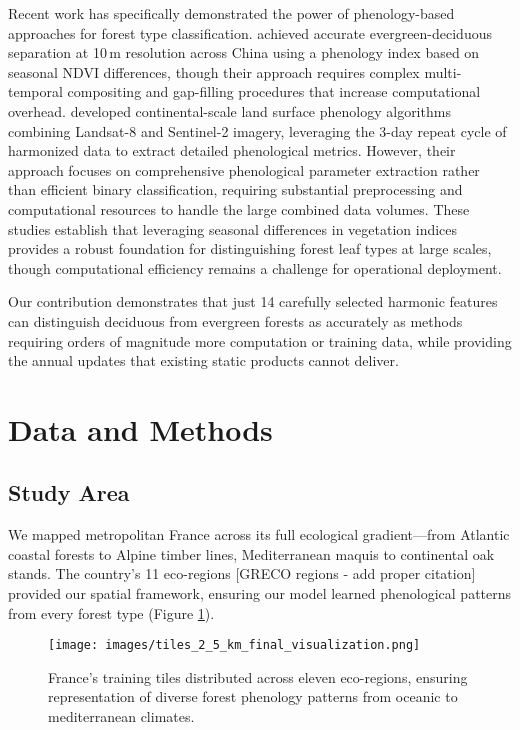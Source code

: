 \documentclass[utf8]{FrontiersinHarvard}
\begin{document}
Recent work has specifically demonstrated the power of phenology-based approaches for forest type classification. \citet{Li2023} achieved accurate evergreen-deciduous separation at 10\,m resolution across China using a phenology index based on seasonal NDVI differences, though their approach requires complex multi-temporal compositing and gap-filling procedures that increase computational overhead. \citet{Bolton2020} developed continental-scale land surface phenology algorithms combining Landsat-8 and Sentinel-2 imagery, leveraging the 3-day repeat cycle of harmonized data to extract detailed phenological metrics. However, their approach focuses on comprehensive phenological parameter extraction rather than efficient binary classification, requiring substantial preprocessing and computational resources to handle the large combined data volumes. These studies establish that leveraging seasonal differences in vegetation indices provides a robust foundation for distinguishing forest leaf types at large scales, though computational efficiency remains a challenge for operational deployment.

Our contribution demonstrates that just 14 carefully selected harmonic features can distinguish deciduous from evergreen forests as accurately as methods requiring orders of magnitude more computation or training data, while providing the annual updates that existing static products cannot deliver.

\section{Data and Methods}

\subsection{Study Area}
We mapped metropolitan France across its full ecological gradient—from Atlantic coastal forests to Alpine timber lines, Mediterranean maquis to continental oak stands. The country's 11 eco-regions [GRECO regions - add proper citation] provided our spatial framework, ensuring our model learned phenological patterns from every forest type (Figure \ref{fig:training_tiles}).

\begin{figure}[H]
    \centering
    \texttt{[image: images/tiles\_2\_5\_km\_final\_visualization.png]}
    \caption{France's training tiles distributed across eleven eco-regions, ensuring representation of diverse forest phenology patterns from oceanic to mediterranean climates.}
    \label{fig:training_tiles}
\end{figure}
\end{document}
